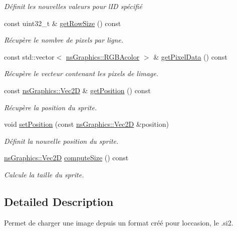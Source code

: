 \begin{DoxyCompactItemize}
\begin{DoxyCompactList}\small\item\em Définit les nouvelles valeurs pour l\textquotesingle{}ID spécifié \end{DoxyCompactList}\item 
const uint32\+\_\+t \& \hyperlink{classns_gui_1_1_sprite_adbe04bd427b6658e0181ce167db83d05}{get\+Row\+Size} () const
\begin{DoxyCompactList}\small\item\em Récupère le nombre de pixels par ligne. \end{DoxyCompactList}\item 
const std\+::vector$<$ \hyperlink{classns_graphics_1_1_r_g_b_acolor}{ns\+Graphics\+::\+R\+G\+B\+Acolor} $>$ \& \hyperlink{classns_gui_1_1_sprite_ad8644780a7a7dcbcd5f2e4e7a461b685}{get\+Pixel\+Data} () const
\begin{DoxyCompactList}\small\item\em Récupère le vecteur contenant les pixels de l\textquotesingle{}image. \end{DoxyCompactList}\item 
const \hyperlink{classns_graphics_1_1_vec2_d}{ns\+Graphics\+::\+Vec2D} \& \hyperlink{classns_gui_1_1_sprite_a1d6ad6681627aae6c4680fc936da8eb2}{get\+Position} () const
\begin{DoxyCompactList}\small\item\em Récupère la position du sprite. \end{DoxyCompactList}\item 
void \hyperlink{classns_gui_1_1_sprite_a4c695910c46504d1e8d47b838394a48e}{set\+Position} (const \hyperlink{classns_graphics_1_1_vec2_d}{ns\+Graphics\+::\+Vec2D} \&position)
\begin{DoxyCompactList}\small\item\em Définit la nouvelle position du sprite. \end{DoxyCompactList}\item 
\hyperlink{classns_graphics_1_1_vec2_d}{ns\+Graphics\+::\+Vec2D} \hyperlink{classns_gui_1_1_sprite_a26b502e88906860373c278495794998c}{compute\+Size} () const
\begin{DoxyCompactList}\small\item\em Calcule la taille du sprite. \end{DoxyCompactList}\end{DoxyCompactItemize}


\subsection{Detailed Description}
Permet de charger une image depuis un format créé pour l\textquotesingle{}occasion, le .si2. 

